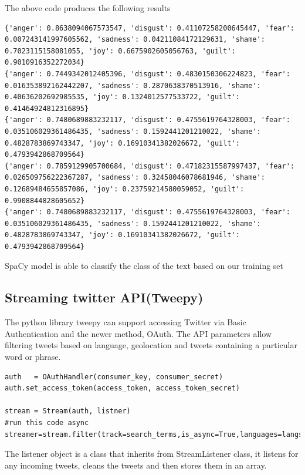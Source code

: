 The above code produces the following results
\begin{lstlisting}
{'anger': 0.8638094067573547, 'disgust': 0.41107258200645447, 'fear': 0.007243141997605562, 'sadness': 0.04211084172129631, 'shame': 0.7023115158081055, 'joy': 0.6675902605056763, 'guilt': 0.9010916352272034}
{'anger': 0.7449342012405396, 'disgust': 0.4830150306224823, 'fear': 0.016353892162442207, 'sadness': 0.2870638370513916, 'shame': 0.40636202692985535, 'joy': 0.1324012577533722, 'guilt': 0.41464924812316895}
{'anger': 0.7480689883232117, 'disgust': 0.4755619764328003, 'fear': 0.035106029361486435, 'sadness': 0.1592441201210022, 'shame': 0.4828783869743347, 'joy': 0.16910341382026672, 'guilt': 0.4793942868709564}
{'anger': 0.7859129905700684, 'disgust': 0.47182315587997437, 'fear': 0.026509756222367287, 'sadness': 0.32458046078681946, 'shame': 0.12689484655857086, 'joy': 0.23759214580059052, 'guilt': 0.9908844828605652}
{'anger': 0.7480689883232117, 'disgust': 0.4755619764328003, 'fear': 0.035106029361486435, 'sadness': 0.1592441201210022, 'shame': 0.4828783869743347, 'joy': 0.16910341382026672, 'guilt': 0.4793942868709564}
\end{lstlisting}

SpaCy model is able to classify the class of the text based on our training set



\clearpage

\subsection{Streaming twitter API(Tweepy)}

The python library tweepy can support accessing Twitter via Basic Authentication and the newer method, OAuth. The API parameters allow filtering tweets based on language, geolocation and tweets containing a particular word or phrase.

\begin{lstlisting}
auth   = OAuthHandler(consumer_key, consumer_secret)
auth.set_access_token(access_token, access_token_secret)

stream = Stream(auth, listner)
#run this code async 
streamer=stream.filter(track=search_terms,is_async=True,languages=langs,locations=loca_tions)
\end{lstlisting}

The listener object is a class that inherits from StreamListener class, it listens for any incoming tweets, cleans the tweets and then stores them in an array.

